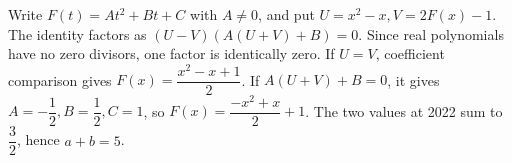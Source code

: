 Write $F(t)=At^2+Bt+C$ with $A\ne0$, and put $U=x^2-x,V=2F(x)-1$. The identity factors as $(U-V)(A(U+V)+B)=0$. Since real polynomials have no zero divisors, one factor is identically zero. If $U=V$, coefficient comparison gives $F(x)=\dfrac{x^2-x+1}{2}$. If $A(U+V)+B=0$, it gives $A=-\dfrac{1}{2},B=\dfrac{1}{2},C=1$, so $F(x)=\dfrac{-x^2+x}{2}+1$. The two values at 2022 sum to $\dfrac{3}{2}$, hence $\boxed{a+b=5}$.

